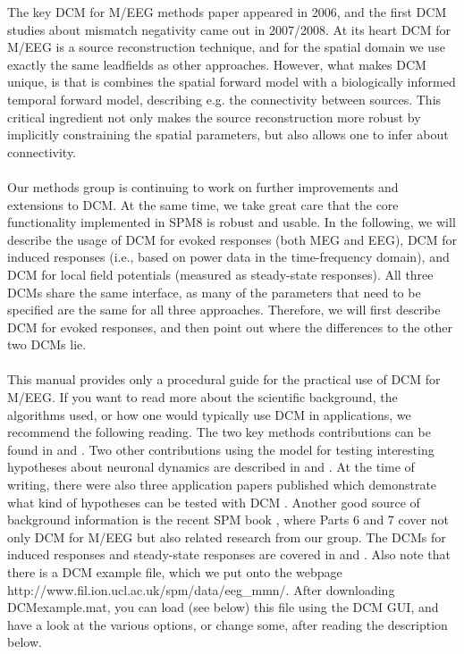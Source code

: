 The key DCM for M/EEG methods paper appeared in 2006, and the
first DCM studies about mismatch negativity came out
in 2007/2008. At its heart DCM for M/EEG is a source reconstruction technique, and for
the spatial domain we use exactly the same leadfields as other
approaches. However, what makes DCM unique, is that is combines the
spatial forward model with a biologically informed temporal forward model, describing e.g. the
connectivity between sources. This critical ingredient not only makes
the source reconstruction more robust by implicitly constraining the
spatial parameters, but also allows one to infer about connectivity.
\\
\\
Our methods group is continuing to work on further
improvements and extensions to DCM. At the same time, we take great
care that the core functionality implemented in SPM8 is robust and usable. In the following, we will describe the usage of DCM for evoked
responses (both MEG and EEG), DCM for induced responses (i.e., based
on power data in the time-frequency domain), and DCM for local field
potentials (measured as steady-state responses). All three DCMs share the
same interface, as many of the parameters that need to be specified are the same for all three approaches. Therefore, we will first
describe DCM for evoked responses, and then point out where the differences to the other two DCMs lie.
\\
\\
This manual provides only a procedural guide for the practical use of DCM for
M/EEG. If you want to read more about the scientific background, the
algorithms used, or how one would typically use DCM in applications,
we recommend the following reading. The two key methods
contributions can be found in \cite{od_dcm_erp} and
\cite{sjk_dcm_erp}. Two other contributions using the model for
testing interesting hypotheses about neuronal dynamics are described
in \cite{sjk_dcm_intrinsic} and \cite{matthias_dcm_constraints}. At
the time of writing, there were also three application papers published which demonstrate
what kind of hypotheses can be tested with DCM
\cite{mg_dcm_repro,mg_feedback,marta_mmndcm}. Another good source of
background information is the recent SPM book
\cite{spm_book}, where Parts 6 and 7 cover not only DCM for M/EEG but
also related research from our group. The DCMs for induced responses
and steady-state responses are covered in \cite{cc_induced} and
\cite{rm_spectralnmm,rm_massmodelspectral}. Also note that there is a DCM example file, which we put onto the webpage http://www.fil.ion.ucl.ac.uk/spm/data/eeg\_mmn/. After downloading DCMexample.mat, you can load (see below) this file using the DCM GUI, and have a look at the various options, or change some, after reading the description below.

